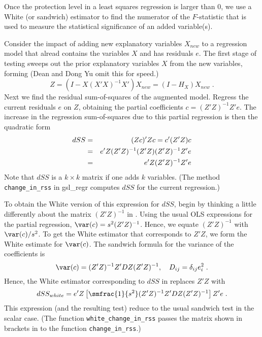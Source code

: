 \documentclass[12pt]{article}
\begin{document}
 Once the protection level in a least squares regression is larger than 0, we
 use a White (or sandwich) estimator to find the numerator of the $F$-statistic
 that is used to measure the statistical significance of an added variable(s).

 Consider the impact of adding new explanatory variables $X_{new}$ to a
 regression model that alread contains the variables $X$ and has residuals
 $e$. The first stage of testing sweeps out the prior explanatory variables $X$
 from the new variables, forming (Dean and Dong Yu omit this for speed.)
\begin{displaymath}
  Z = (I-X(X'X)^{-1}X') X_{new} = (I-H_X) X_{new}  \;.
\end{displaymath}
 Next we find the residual sum-of-squares of the augmented model.  Regress the
 current residuals $e$ on $Z$, obtaining the partial coefficients $c =
 (Z'Z)^{-1}Z'e$.  The increase in the regression sum-of-squares due to this
 partial regression is then the quadratic form
\begin{eqnarray}
  dSS &=& (Zc)'Zc = c'(Z'Z)c \cr
      &=& e'Z(Z'Z)^{-1}(Z'Z)(Z'Z)^{-1}Z'e \cr
      &=&  e'Z(Z'Z)^{-1}Z'e
\label{eq:dss}
\end{eqnarray}
 Note that $dSS$ is a $k\times k$ matrix if one adds $k$ variables. (The method
 {\tt change\_in\_rss} in gsl\_regr computes $dSS$ for the current regression.)


 To obtain the White version of this expression for $dSS$, begin by thinking a
 little differently about the matrix $(Z'Z)^{-1}$ in . Using the
 usual OLS expressions for the partial regression, $\var(c) = s^2 (Z'Z)^{-1}$.
  Hence, we equate $(Z'Z)^{-1}$ with $\var(c)/s^2$. To get the White
 estimator that corresponds to $Z'Z$, we form the White estimate for $\var(c)$.
  The sandwich formula for the variance of the coefficients is
\begin{displaymath}
  \var(c) = (Z'Z)^{-1} Z'DZ (Z'Z)^{-1}, \quad D_{ij} = \delta_{ij} e_i^2\;.
\end{displaymath}
 Hence, the White estimator corresponding to $dSS$ in  replaces
$Z'Z$ with
\begin{equation}
 dSS_{white} = e'Z\left[\smfrac{1}{s^2}(Z'Z)^{-1} Z'DZ (Z'Z)^{-1}\right] Z'e  \;.
\label{eq:wdss}
\end{equation}
 This expression (and the resulting test) reduce to the usual sandwich test in
 the scalar case.  (The function {\tt white\_change\_in\_rss} passes the matrix
 shown in brackets in  to the function {\tt change\_in\_rss}.)
\end{document}
